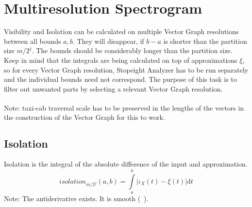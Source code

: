 \documentclass{report}
\begin{document}
\chapter{Multiresolution Spectrogram}
Visibility and Isolation can be calculated on multiple Vector Graph resolutions between all bounds $a,b$. They will disappear, if $b-a$ is shorter than the partition size $m/2^j$.
The bounds should be considerably longer than the partition size. Keep in mind that the integrals are being calculated on top of approximations $\xi$, so for every Vector Graph resolution, Stopeight Analyzer has to be run separately and the individual bounds need not correspond. The purpose of this task is to filter out unwanted parts by selecting a relevant Vector Graph resolution.\\\\
Note: taxi-cab traversal scale has to be preserved in the lengths of the vectors in the construction of the Vector Graph for this to work.

\section{Isolation}
Isolation is the integral of the absolute difference of the input and approximation.
\begin{equation}
isolation_{m/2^j}(a,b)=\int \limits _{a}^{b} \vert\iota_{X}(t)-\xi(t)\vert \mathrm{d}t
\end{equation}
Note: The antiderivative exists. It is smooth (~\cite[Riemann Integrable]{Widon}).\\\\
\end{document}
